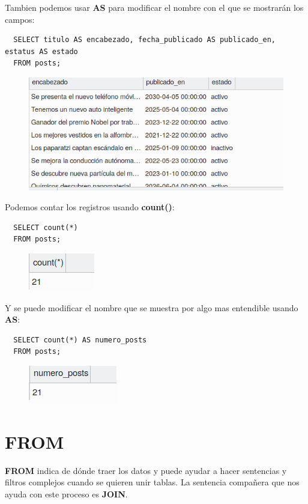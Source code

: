 \documentclass{article}
\begin{document}
Tambien podemos usar \textbf{AS} para modificar el nombre con el que se mostrarán los campos:
\begin{verbatim}
  SELECT titulo AS encabezado, fecha_publicado AS publicado_en, estatus AS estado
  FROM posts;
\end{verbatim}
\begin{figure}[h!]
  \centering
  \includegraphics[scale=0.55]{./Pictures/081_select_as.png}
\end{figure}

\newpage

Podemos contar los registros usando \textbf{count()}:
\begin{verbatim}
  SELECT count(*)
  FROM posts;
\end{verbatim}
\begin{figure}[h!]
  \centering
  \includegraphics[scale=0.75]{./Pictures/082_select_count.png}
\end{figure}


Y se puede modificar el nombre que se muestra por algo mas entendible usando
\textbf{AS}:
\begin{verbatim}
  SELECT count(*) AS numero_posts
  FROM posts;
\end{verbatim}
\begin{figure}[h!]
  \centering
  \includegraphics[scale=0.75]{./Pictures/083_select_count_as.png}
\end{figure}


\section{FROM}%
\textbf{FROM} indica de dónde traer los datos y puede ayudar a hacer sentencias
y filtros complejos cuando se quieren unir tablas. La sentencia compañera que
nos ayuda con este proceso es \textbf{JOIN}.\\
\end{document}
